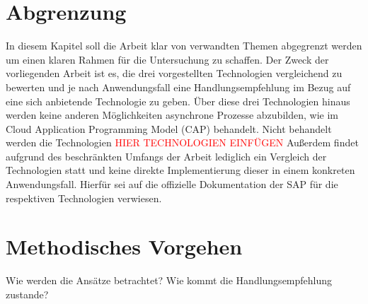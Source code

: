 \section{Abgrenzung}

In diesem Kapitel soll die Arbeit klar von verwandten Themen abgegrenzt werden um einen klaren Rahmen für die Untersuchung zu schaffen. Der Zweck der vorliegenden Arbeit ist es, die drei vorgestellten Technologien vergleichend zu bewerten und je nach Anwendungsfall eine Handlungsempfehlung im Bezug auf eine sich anbietende Technologie zu geben. Über diese drei Technologien hinaus werden keine anderen Möglichkeiten asynchrone Prozesse abzubilden, wie \zB im Cloud Application Programming Model (CAP) behandelt.  Nicht behandelt werden die Technologien \textcolor{red}{HIER TECHNOLOGIEN EINFÜGEN} Au{\ss}erdem findet aufgrund des beschränkten Umfangs der Arbeit lediglich ein Vergleich der Technologien statt und keine direkte Implementierung dieser in einem konkreten Anwendungsfall. Hierfür sei auf die offizielle Dokumentation der SAP für die respektiven Technologien verwiesen.

\section{Methodisches Vorgehen}

Wie werden die Ansätze betrachtet? Wie kommt die Handlungsempfehlung zustande?